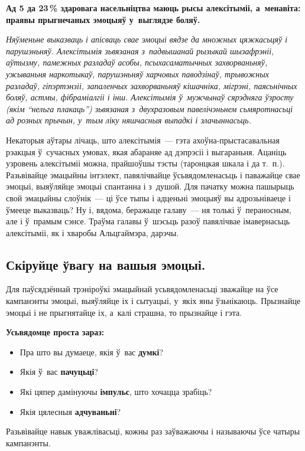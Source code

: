\textbf{Ад 5 да 23\,\% здаровага насельніцтва маюць рысы алексітыміі, а~менавіта: праявы прыгнечаных эмоцыяў у~выглядзе боляў.}

\emph{Няўменьне выказваць і апісваць свае эмоцыі вядзе да множных цяжкасьцяў і парушэньняў. Алексітымія зьвязаная з~падвышанай рызыкай шызафрэніі, аўтызму, памежных разладаў асобы, псыхасаматычных захворваньняў, ужываньня наркотыкаў, парушэньняў харчовых паводзінаў, трывожных разладаў, гіпэртэнзіі, запаленчых захворваньняў кішачніка, мігрэні, паясьнічных боляў, астмы, фібраміалгіі і інш. Алексітымія ў~мужчынаў сярэдняга ўзросту (якім ``нельга плакаць'') зьвязаная з~двухразовым павелічэньнем сьмяротнасьці ад розных прычын, у~тым ліку няшчасныя выпадкі і злачыннасьць.}

Некаторыя аўтары лічаць, што алексітымія~--- гэта ахоўна-прыстасавальная рэакцыя ў~сучасных умовах, якая абараняе ад дэпрэсіі і выгараньня. Ацаніць узровень алексітыміі можна, прайшоўшы тэсты (таронцкая шкала і да т.~п.). Разьвівайце эмацыйны інтэлект, павялічвайце ўсьвядомленасьць і паважайце свае эмоцыі, выяўляйце эмоцыі спантанна і з~душой. Для пачатку можна пашырыць свой эмацыйны слоўнік~--- ці ўсе тыпы і адценьні эмоцыяў вы адрозьніваеце і ўмееце выказваць? Ну і, вядома, беражыце галаву~--- ня толькі ў~пераносным, але і ў~прамым сэнсе. Траўма галавы ў~шэсьць разоў павялічвае імавернасьць алексітыміі, як і хваробы Альцгаймэра, дарэчы.

\subsection*{Скіруйце ўвагу на вашыя эмоцыі.}

Для паўсядзённай трэніроўкі эмацыйнай усьвядомленасьці зважайце на ўсе кампанэнты эмоцыі, выяўляйце іх і сытуацыі, у~якіх яны ўзьнікаюць. Прызнайце эмоцыі і не прыгнятайце іх, а~калі страшна, то прызнайце і гэта.

\textbf{Усьвядомце проста зараз:} 
\begin{itemize}
  \item Пра што вы думаеце, якія ў~вас \textbf{думкі}?
  \item Якія ў~вас \textbf{пачуцьці}?
  \item Які цяпер дамінуючы \textbf{імпульс}, што хочацца зрабіць?
  \item Якія цялесныя \textbf{адчуваньні}?
\end{itemize}

Разьвівайце навык уважлівасьці, кожны раз заўважаючы і называючы ўсе чатыры кампанэнты.

